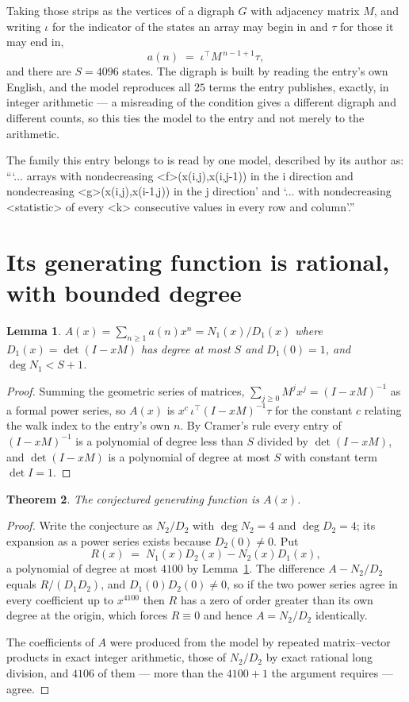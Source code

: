 \documentclass[11pt,a4paper]{article}
\theoremstyle{plain}
\newtheorem{theorem}{Theorem}
\newtheorem{lemma}[theorem]{Lemma}
\theoremstyle{definition}
\begin{document}
Taking those strips as the vertices of a digraph $G$ with adjacency matrix $M$, and writing
$\iota$ for the indicator of the states an array may begin in and $\tau$ for those it may end
in,
\[
a(n)\;=\;\iota^{\!\top}M^{\,n-1+1}\tau ,
\]
and there are $S=4096$ states. The digraph is built by reading the entry's own English, and the
model reproduces all $25$ terms the entry publishes, exactly, in integer arithmetic --- a
misreading of the condition gives a different digraph and different counts, so this ties the
model to the entry and not merely to the arithmetic.

The family this entry belongs to is read by one model, described by its author as: ```... arrays with nondecreasing <f>(x(i,j),x(i,j-1)) in the i direction and nondecreasing <g>(x(i,j),x(i-1,j)) in the j direction' and `... with nondecreasing <statistic> of every <k> consecutive values in every row and column'.''


\section{Its generating function is rational, with bounded degree}

\begin{lemma}\label{lem:rat}
$A(x)=\sum_{n\ge1}a(n)x^n=N_1(x)/D_1(x)$ where $D_1(x)=\det(I-xM)$ has degree at most
$S$ and $D_1(0)=1$, and $\deg N_1<S+1$.
\end{lemma}

\begin{proof}
Summing the geometric series of matrices, $\sum_{j\ge0}M^jx^j=(I-xM)^{-1}$ as a formal
power series, so $A(x)$ is $x^{c}\,\iota^{\!\top}(I-xM)^{-1}\tau$ for the constant $c$
relating the walk index to the entry's own $n$. By Cramer's rule every entry of
$(I-xM)^{-1}$ is a polynomial of degree less than $S$ divided by $\det(I-xM)$, and
$\det(I-xM)$ is a polynomial of degree at most $S$ with constant term $\det I=1$.
\end{proof}

\begin{theorem}
The conjectured generating function is $A(x)$.
\end{theorem}

\begin{proof}
Write the conjecture as $N_2/D_2$ with $\deg N_2=4$ and $\deg D_2=4$; its expansion as a
power series exists because $D_2(0)\neq0$. Put
\[
R(x)\;=\;N_1(x)D_2(x)-N_2(x)D_1(x),
\]
a polynomial of degree at most $4100$ by Lemma~\ref{lem:rat}. The difference
$A-N_2/D_2$ equals $R/(D_1D_2)$, and $D_1(0)D_2(0)\neq0$, so if the two power series agree in
every coefficient up to $x^{4100}$ then $R$ has a zero of order greater than its own
degree at the origin, which forces $R\equiv0$ and hence $A=N_2/D_2$ identically.

The coefficients of $A$ were produced from the model by repeated matrix--vector products in
exact integer arithmetic, those of $N_2/D_2$ by exact rational long division, and $4106$
of them --- more than the $4100+1$ the argument requires --- agree.
\end{proof}
\end{document}
